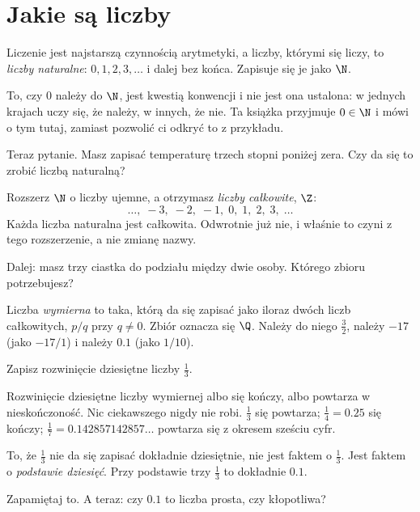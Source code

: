\section{Jakie są liczby}
\label{sec:F01-sets}

\begin{fr}
Liczenie jest najstarszą czynnością arytmetyki, a liczby, którymi się liczy, to
\emph{liczby naturalne}: $0, 1, 2, 3, \dots$ i dalej bez końca. Zapisuje się je
jako $\N$.

To, czy $0$ należy do $\N$, jest kwestią konwencji i nie jest ona ustalona: w
jednych krajach uczy się, że należy, w innych, że nie. Ta książka przyjmuje
$0 \in \N$ i mówi o tym tutaj, zamiast pozwolić ci odkryć to z przykładu.

Teraz pytanie. Masz zapisać temperaturę trzech stopni poniżej zera. Czy da się
to zrobić liczbą naturalną?
\nextframe
\end{fr}

\begin{fr}
Rozszerz $\N$ o liczby ujemne, a otrzymasz \emph{liczby całkowite}, $\Z$:
\[ \dots,\; -3,\; -2,\; -1,\; 0,\; 1,\; 2,\; 3,\; \dots \]
Każda liczba naturalna jest całkowita. Odwrotnie już nie, i właśnie to czyni z
tego rozszerzenie, a nie zmianę nazwy.

Dalej: masz trzy ciastka do podziału między dwie osoby. Którego zbioru
potrzebujesz?
\nextframe
\end{fr}

\begin{fr}
Liczba \emph{wymierna} to taka, którą da się zapisać jako iloraz dwóch liczb
całkowitych, $p/q$ przy $q \ne 0$. Zbiór oznacza się $\Q$. Należy do niego
$\tfrac{3}{2}$, należy $-17$ (jako $-17/1$) i należy $\num{0.1}$ (jako
$1/10$).

Zapisz rozwinięcie dziesiętne liczby $\tfrac{1}{3}$.
\nextframe
\end{fr}

\begin{fr}
Rozwinięcie dziesiętne liczby wymiernej albo się kończy, albo powtarza w
nieskończoność. Nic ciekawszego nigdy nie robi. $\tfrac{1}{3}$ się powtarza;
$\tfrac{1}{4} = \num{0.25}$ się kończy; $\tfrac{1}{7} =
\num{0.142857142857}\dots$ powtarza się z okresem sześciu cyfr.

To, że $\tfrac{1}{3}$ nie da się zapisać dokładnie dziesiętnie, nie jest faktem
o $\tfrac{1}{3}$. Jest faktem o \emph{podstawie dziesięć}. Przy podstawie trzy
$\tfrac{1}{3}$ to dokładnie $\num{0.1}$.

Zapamiętaj to. A teraz: czy $\num{0.1}$ to liczba prosta, czy kłopotliwa?
\nextframe
\end{fr}

